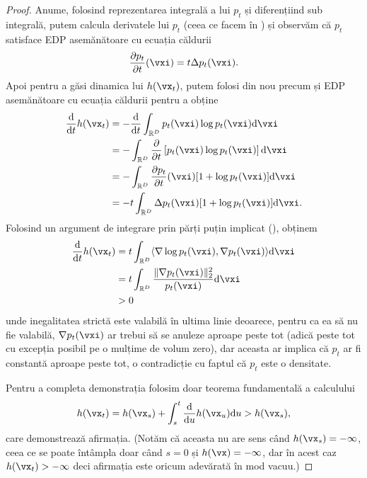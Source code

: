 \documentclass[../../book-main_ro.tex]{subfiles}
\begin{document}
\begin{proof}
    Anume, folosind reprezentarea integrală a lui \(p_{t}\) și diferențiind sub integrală, putem calcula derivatele lui \(p_{t}\) (ceea ce facem în ) și observăm că \(p_{t}\) satisface EDP asemănătoare cu ecuația căldurii
    \begin{equation}
        \pdv{p_{t}}{t}(\vxi) = t\Delta p_{t}(\vxi).
    \end{equation}
    Apoi pentru a găsi dinamica lui \(h(\vx_{t})\), putem folosi  din nou precum și EDP asemănătoare cu ecuația căldurii pentru a obține
    \begin{align}
        \odv*{h(\vx_{t})}{t}
        &= -\odv*{\int_{\R^{D}}p_{t}(\vxi)\log p_{t}(\vxi)\odif{\vxi}}{t} \\
        &= -\int_{\R^{D}}\pdv*{\bs{p_{t}(\vxi)\log p_{t}(\vxi)}}{t}\odif{\vxi} \\
        &= -\int_{\R^{D}}\pdv{p_{t}}{t}(\vxi)[1 + \log p_{t}(\vxi)]\odif{\vxi} \\
        &= -t\int_{\R^{D}}\Delta p_{t}(\vxi)[1 + \log p_{t}(\vxi)]\odif{\vxi}.
    \end{align}
    Folosind un argument de integrare prin părți puțin implicat (), obținem 
    \begin{align}
        \odv*{h(\vx_{t})}{t}
        &= t\int_{\R^{D}}\ip{\nabla \log p_{t}(\vxi)}{\nabla p_{t}(\vxi)}\odif{\vxi} \\
        &= t\int_{\R^{D}}\frac{\norm{\nabla p_{t}(\vxi)}_{2}^{2}}{p_{t}(\vxi)}\odif{\vxi} \\
        &> 0
    \end{align}
    unde inegalitatea strictă este valabilă în ultima linie deoarece, pentru ca ea să nu fie valabilă, \(\nabla p_{t}(\vxi)\) ar trebui să se anuleze aproape peste tot (adică peste tot cu excepția posibil pe o mulțime de volum zero), dar aceasta ar implica că \(p_{t}\) ar fi constantă aproape peste tot, o contradicție cu faptul că \(p_{t}\) este o densitate.

    Pentru a completa demonstrația folosim doar teorema fundamentală a calculului
    \begin{equation}
        h(\vx_{t}) = h(\vx_{s}) + \int_{s}^{t}\odv*{h(\vx_{u})}{u}\odif{u} > h(\vx_{s}),
    \end{equation}
    care demonstrează afirmația. (Notăm că aceasta nu are sens când \(h(\vx_{s}) = -\infty\), ceea ce se poate întâmpla doar când \(s = 0\) și \(h(\vx) = -\infty\), dar în acest caz \(h(\vx_{t}) > -\infty\) deci afirmația este oricum adevărată în mod vacuu.)
\end{proof}
\end{document}
